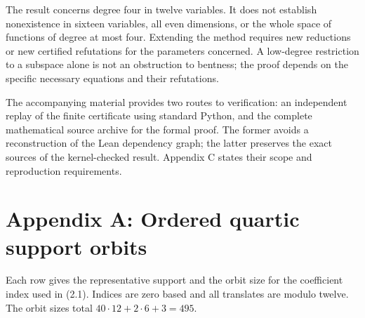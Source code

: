 \documentclass[11pt,a4paper]{article}
\begin{document}
The result concerns degree four in twelve variables. It does not establish nonexistence in sixteen variables, all even dimensions, or the whole space of functions of degree at most four. Extending the method requires new reductions or new certified refutations for the parameters concerned. A low-degree restriction to a subspace alone is not an obstruction to bentness; the proof depends on the specific necessary equations and their refutations.

The accompanying material provides two routes to verification: an independent replay of the finite certificate using standard Python, and the complete mathematical source archive for the formal proof. The former avoids a reconstruction of the Lean dependency graph; the latter preserves the exact sources of the kernel-checked result. Appendix C states their scope and reproduction requirements.

\section*{Appendix A: Ordered quartic support orbits}

Each row gives the representative support and the orbit size for the coefficient index used in (2.1). Indices are zero based and all translates are modulo twelve. The orbit sizes total $40\cdot12+2\cdot6+3=495$.
\end{document}
